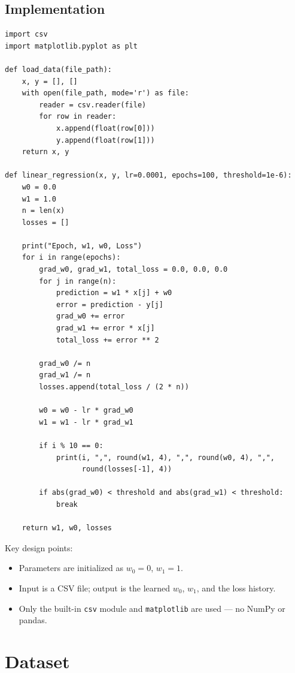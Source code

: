 \documentclass[12pt,a4paper]{article}
\begin{document}
\subsection{Implementation}

\begin{lstlisting}[caption={Linear Regression from Scratch}]
import csv
import matplotlib.pyplot as plt

def load_data(file_path):
    x, y = [], []
    with open(file_path, mode='r') as file:
        reader = csv.reader(file)
        for row in reader:
            x.append(float(row[0]))
            y.append(float(row[1]))
    return x, y

def linear_regression(x, y, lr=0.0001, epochs=100, threshold=1e-6):
    w0 = 0.0
    w1 = 1.0
    n = len(x)
    losses = []

    print("Epoch, w1, w0, Loss")
    for i in range(epochs):
        grad_w0, grad_w1, total_loss = 0.0, 0.0, 0.0
        for j in range(n):
            prediction = w1 * x[j] + w0
            error = prediction - y[j]
            grad_w0 += error
            grad_w1 += error * x[j]
            total_loss += error ** 2

        grad_w0 /= n
        grad_w1 /= n
        losses.append(total_loss / (2 * n))

        w0 = w0 - lr * grad_w0
        w1 = w1 - lr * grad_w1

        if i % 10 == 0:
            print(i, ",", round(w1, 4), ",", round(w0, 4), ",",
                  round(losses[-1], 4))

        if abs(grad_w0) < threshold and abs(grad_w1) < threshold:
            break

    return w1, w0, losses
\end{lstlisting}

Key design points:
\begin{itemize}
    \item Parameters are initialized as $w_0 = 0$, $w_1 = 1$.
    \item Input is a CSV file; output is the learned $w_0$, $w_1$, and the loss history.
    \item Only the built-in \texttt{csv} module and \texttt{matplotlib} are used --- no NumPy or pandas.
\end{itemize}

\section{Dataset}
\end{document}
